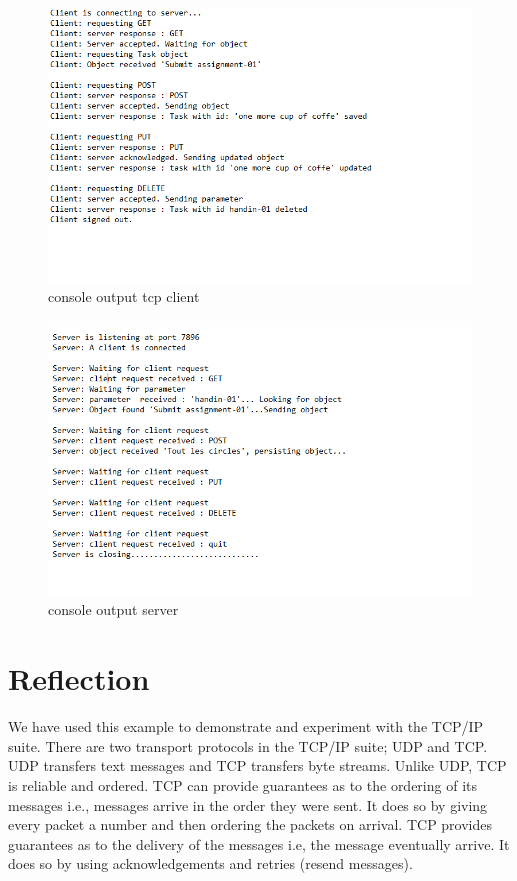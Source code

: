\begin{figure}[H]
\centering
\caption{console output tcp client}
\includegraphics[scale=0.7]{images/TCP_run_client.png}
\end{figure}
\vspace{10pt}


\begin{figure}[H]
\centering
\caption{console output server}
\includegraphics[scale=0.7]{images/TCP_run_server.png}
\end{figure}
\vspace{10pt}

\section{Reflection}
\label{tcp_reflection}

We have used this example to demonstrate and experiment with the TCP/IP suite. There are two transport protocols in the TCP/IP suite; UDP and TCP. UDP transfers text messages and TCP transfers byte streams. Unlike UDP, TCP is reliable and ordered. TCP can provide guarantees as to the ordering of its messages i.e., messages arrive in the order they were sent. It does so by giving every packet a number and then ordering the packets on arrival. TCP provides guarantees as to the delivery of the messages i.e, the message eventually arrive. It does so by using acknowledgements and retries (resend messages).   \\

